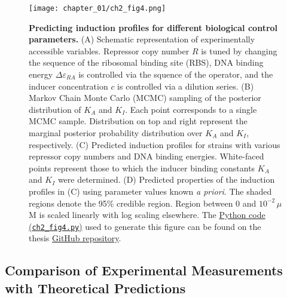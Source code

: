 \documentclass[12pt]{caltech_thesis}
\begin{document}
\hypertarget{fig:induction_predictions}{%
\begin{figure}
\centering
\texttt{[image: chapter\_01/ch2\_fig4.png]}
\caption[{Predicting induction profiles for different biological control
parameters.}]{\textbf{Predicting induction profiles for different
biological control parameters.} (A) Schematic representation of
experimentally accessible variables. Repressor copy number \(R\) is
tuned by changing the sequence of the ribosomal binding site (RBS), DNA
binding energy \(\Delta\varepsilon_{RA}\) is controlled via the squence
of the operator, and the inducer concentration \(c\) is controlled via a
dilution series. (B) Markov Chain Monte Carlo (MCMC) sampling of the
posterior distribution of \(K_A\) and \(K_I\). Each point corresponds to
a single MCMC sample. Distribution on top and right represent the
marginal posterior probability distribution over \(K_A\) and \(K_I\),
respectively. (C) Predicted induction profiles for strains with various
repressor copy numbers and DNA binding energies. White-faced points
represent those to which the inducer binding constants \(K_A\) and
\(K_I\) were determined. (D) Predicted properties of the induction
profiles in (C) using parameter values known \emph{a priori}. The shaded
regions denote the 95\% credible region. Region between 0 and
\(10^{-2}\, \mu\)M is scaled linearly with log scaling elsewhere. The
\href{https://github.com/gchure/phd/blob/master/src/chapter_02/code/ch2_fig4.py}{Python
code (\texttt{ch2\_fig4.py})} used to generate this figure can be found
on the thesis \href{https://github.com/gchure/phd}{GitHub repository}.}
\label{fig:induction_predictions}
\end{figure}
}

\hypertarget{comparison-of-experimental-measurements-with-theoretical-predictions}{%
\subsection{Comparison of Experimental Measurements with Theoretical
Predictions}\label{comparison-of-experimental-measurements-with-theoretical-predictions}}
\end{document}
